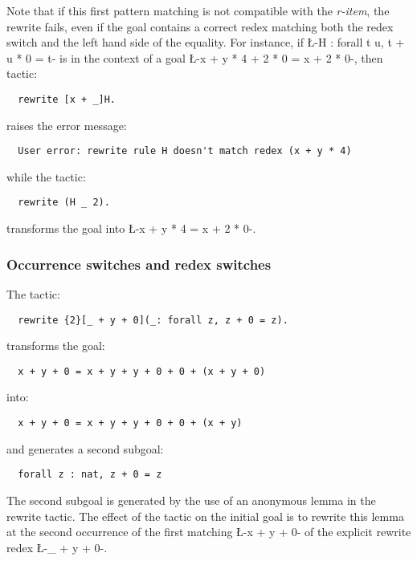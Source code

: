 Note that if this first pattern matching is not compatible with the
\emph{r-item}, the rewrite fails, even if the goal contains a correct
redex matching both the redex switch and the left hand side of the
equality. For instance, if \L-H : forall t u, t + u * 0 = t- is
in the context of a goal \L-x + y * 4 + 2 * 0 = x + 2 * 0-, then tactic:
\begin{lstlisting}
  rewrite [x + _]H.
\end{lstlisting}
raises the error message:
\begin{verbatim}
  User error: rewrite rule H doesn't match redex (x + y * 4)
\end{verbatim}
while the tactic:
\begin{lstlisting}
  rewrite (H _ 2).
\end{lstlisting}
transforms the goal into \L-x + y * 4 = x + 2 * 0-.


\subsubsection*{Occurrence switches and redex switches}
The tactic:
\begin{lstlisting}
  rewrite {2}[_ + y + 0](_: forall z, z + 0 = z).
\end{lstlisting}
transforms the goal:
\begin{lstlisting}
  x + y + 0 = x + y + y + 0 + 0 + (x + y + 0)
\end{lstlisting}
into:
\begin{lstlisting}
  x + y + 0 = x + y + y + 0 + 0 + (x + y)
\end{lstlisting}
and generates a second subgoal:
\begin{lstlisting}
  forall z : nat, z + 0 = z
\end{lstlisting}
The second subgoal is generated by the use of an anonymous lemma in
the rewrite tactic. The effect of the tactic on the initial goal is to
rewrite this lemma at the second occurrence of the first matching
\L-x + y + 0- of the explicit rewrite redex \L-_ + y + 0-.


